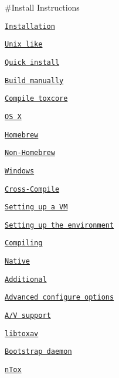 \#\+Install Instructions


\begin{DoxyItemize}
\item \href{#installation}{\tt Installation}
\begin{DoxyItemize}
\item \href{#unix}{\tt Unix like}
\begin{DoxyItemize}
\item \href{#quick-install}{\tt Quick install}
\item \href{#build-manually}{\tt Build manually}
\begin{DoxyItemize}
\item \href{#compile-toxcore}{\tt Compile toxcore}
\end{DoxyItemize}
\end{DoxyItemize}
\item \href{#osx}{\tt O\+S X}
\begin{DoxyItemize}
\item \href{#homebrew}{\tt Homebrew}
\item \href{#non-homebrew}{\tt Non-\/\+Homebrew}
\end{DoxyItemize}
\item \href{#windows}{\tt Windows}
\begin{DoxyItemize}
\item \href{#windows-cross-compile}{\tt Cross-\/\+Compile}
\begin{DoxyItemize}
\item \href{#windows-cross-compile-vm}{\tt Setting up a V\+M}
\item \href{#windows-cross-compile-environment}{\tt Setting up the environment}
\item \href{#windows-cross-compile-compiling}{\tt Compiling}
\end{DoxyItemize}
\item \href{#windows-native}{\tt Native}
\end{DoxyItemize}
\end{DoxyItemize}
\item \href{#additional}{\tt Additional}
\begin{DoxyItemize}
\item \href{#aconf}{\tt Advanced configure options}
\item \href{#av}{\tt A/\+V support}
\begin{DoxyItemize}
\item \href{#libtoxav}{\tt libtoxav}
\end{DoxyItemize}
\item \href{#bootstrapd}{\tt Bootstrap daemon}
\item \href{#ntox}{\tt n\+Tox}
\end{DoxyItemize}
\end{DoxyItemize}

